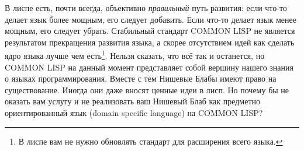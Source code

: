 В лиспе есть, почти всегда, объективно \emph{правильный} путь развития: если что-то делает язык более мощным, его следует добавить. Если что-то делает язык менее мощным, его следует убрать. Стабильный стандарт COMMON LISP не является результатом прекращения развития языка, а скорее отсутствием идей как сделать ядро языка лучше чем есть\footnote[3]{В лиспе вам не нужно обновлять стандарт для расширения всего языка.}. Нельзя сказать, что всё так и останется, но COMMON LISP на данный момент представляет собой вершину нашего знания о языках программирования. Вместе с тем Нишевые Блабы имеют право на существование. Иногда они даже вносят ценные идеи в лисп. Но почему бы не оказать вам услугу и не реализовать ваш Нишевый Блаб как предметно ориентированный язык (domain specific language) на COMMON LISP?
